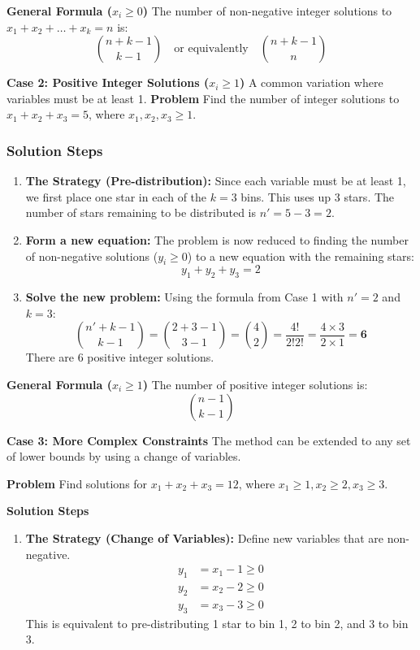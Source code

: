 \begin{solutionbox}
\textbf{General Formula ($x_i \ge 0$)}
The number of non-negative integer solutions to $x_1 + x_2 + \dots + x_k = n$ is:
\[
\binom{n+k-1}{k-1} \quad \text{or equivalently} \quad \binom{n+k-1}{n}
\]

\textbf{Case 2: Positive Integer Solutions ($x_i \ge 1$)}
A common variation where variables must be at least 1.
\textbf{Problem}
Find the number of integer solutions to $x_1 + x_2 + x_3 = 5$, where $x_1, x_2, x_3 \ge 1$.

\subsubsection*{Solution Steps}
\begin{enumerate}
    \item \textbf{The Strategy (Pre-distribution):} Since each variable must be at least 1, we first place one star in each of the $k=3$ bins. This uses up 3 stars. The number of stars remaining to be distributed is $n' = 5 - 3 = 2$.
    
    \item \textbf{Form a new equation:} The problem is now reduced to finding the number of non-negative solutions ($y_i \ge 0$) to a new equation with the remaining stars:
    \[
    y_1 + y_2 + y_3 = 2
    \]
    
    \item \textbf{Solve the new problem:} Using the formula from Case 1 with $n'=2$ and $k=3$:
    \[
    \binom{n'+k-1}{k-1} = \binom{2+3-1}{3-1} = \binom{4}{2} = \frac{4!}{2!2!} = \frac{4 \times 3}{2 \times 1} = \mathbf{6}
    \]
    There are 6 positive integer solutions.
\end{enumerate}

\textbf{General Formula ($x_i \ge 1$)}
The number of positive integer solutions is:
\[
\binom{n-1}{k-1}
\]

\textbf{Case 3: More Complex Constraints}
The method can be extended to any set of lower bounds by using a change of variables.

\textbf{Problem}
Find solutions for $x_1 + x_2 + x_3 = 12$, where $x_1 \ge 1, x_2 \ge 2, x_3 \ge 3$.

\textbf{Solution Steps}
\begin{enumerate}
    \item \textbf{The Strategy (Change of Variables):} Define new variables that are non-negative.
    \begin{align*}
        y_1 &= x_1 - 1 \ge 0 \\
        y_2 &= x_2 - 2 \ge 0 \\
        y_3 &= x_3 - 3 \ge 0
    \end{align*}
    This is equivalent to pre-distributing 1 star to bin 1, 2 to bin 2, and 3 to bin 3.
    

\end{enumerate}
\end{solutionbox}
